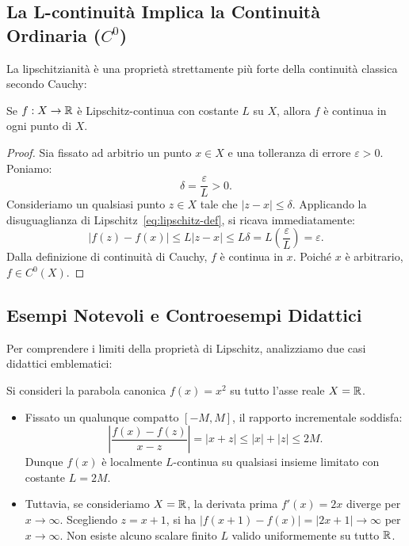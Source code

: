 \subsection{La L-continuit\`a Implica la Continuit\`a Ordinaria ($C^0$)}
La lipschitzianit\`a \`e una propriet\`a strettamente pi\`u forte della continuit\`a classica secondo Cauchy:

\begin{theorem}
Se $f: X \to \mathbb{R}$ \`e Lipschitz-continua con costante $L$ su $X$, allora $f$ \`e continua in ogni punto di $X$.
\end{theorem}
\begin{proof}
Sia fissato ad arbitrio un punto $x \in X$ e una tolleranza di errore $\varepsilon > 0$. Poniamo:
\begin{equation}
    \delta = \frac{\varepsilon}{L} > 0.
\end{equation}
Consideriamo un qualsiasi punto $z \in X$ tale che $|z - x| \le \delta$. Applicando la disuguaglianza di Lipschitz~\eqref{eq:lipschitz-def}, si ricava immediatamente:
\begin{equation}
    |f(z) - f(x)| \le L |z - x| \le L \delta = L \left( \frac{\varepsilon}{L} \right) = \varepsilon.
\end{equation}
Dalla definizione di continuit\`a di Cauchy, $f$ \`e continua in $x$. Poich\'e $x$ \`e arbitrario, $f \in C^0(X)$.
\end{proof}

\subsection{Esempi Notevoli e Controesempi Didattici}
Per comprendere i limiti della propriet\`a di Lipschitz, analizziamo due casi didattici emblematici:

\begin{example}
Si consideri la parabola canonica $f(x) = x^2$ su tutto l'asse reale $X = \mathbb{R}$.
\begin{itemize}
    \item Fissato un qualunque compatto $[-M, M]$, il rapporto incrementale soddisfa:
    \begin{equation}
        \left| \frac{f(x) - f(z)}{x - z} \right| = |x + z| \le |x| + |z| \le 2M.
    \end{equation}
    Dunque $f(x)$ \`e localmente $L$-continua su qualsiasi insieme limitato con costante $L = 2M$.
    \item Tuttavia, se consideriamo $X = \mathbb{R}$, la derivata prima $f'(x) = 2x$ diverge per $x \to \infty$. Scegliendo $z = x + 1$, si ha $|f(x+1) - f(x)| = |2x + 1| \to \infty$ per $x \to \infty$. Non esiste alcuno scalare finito $L$ valido uniformemente su tutto $\mathbb{R}$.
\end{itemize}
\end{example}

